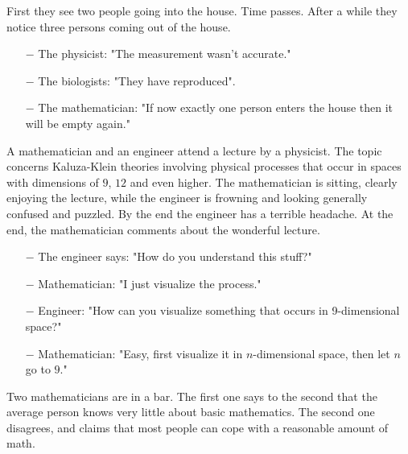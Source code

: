 First they see two people going into the house. Time passes. After a while they notice three persons coming out of the house. 

\begin{itemize}	 
	\item[$-$] The physicist: "The measurement wasn't accurate."

	\item[$-$] The biologists: "They have reproduced".

	\item[$-$] The mathematician: "If now exactly one person enters the house then it will be empty again."
\end{itemize}
	\begin{center}\underline{\hspace{5 cm}}\end{center}

A mathematician and an engineer attend a lecture by a physicist. The topic concerns Kaluza-Klein theories involving physical processes that occur in spaces with dimensions of $9$, $12$ and even higher. The mathematician is sitting, clearly enjoying the lecture, while the engineer is frowning and looking generally confused and puzzled. By the end the engineer has a terrible headache. At the end, the mathematician comments about the wonderful lecture. 

\begin{itemize}	 
	\item[$-$] The engineer says: "How do you understand this stuff?"

	\item[$-$] Mathematician: "I just visualize the process."

	\item[$-$] Engineer: "How can you visualize something that occurs in 9-dimensional space?"

	\item[$-$] Mathematician: "Easy, first visualize it in $n$-dimensional space, then let $n$ go to $9$."
\end{itemize}
	\begin{center}\underline{\hspace{5 cm}}\end{center}

Two mathematicians are in a bar. The first one says to the second that the average person knows very little about basic mathematics. The second one disagrees, and claims that most people can cope with a reasonable amount of math. 

